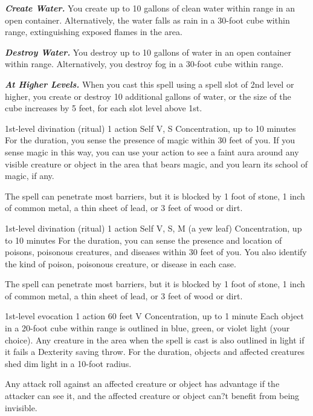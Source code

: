\documentclass[10pt,twoside,twocolumn,openany]{book}
\newcommand\impact[1]{
	\textbf{\textit{#1}}
}
\begin{document}
\impact{Create Water.} You create up to 10 gallons of clean
water within range in an open container. Alternatively, the water falls as rain in a 30-foot cube within range, extinguishing exposed flames in the area.

\impact{Destroy Water.} You destroy up to 10 gallons of water in an open container within range. Alternatively, you destroy fog in a 30-foot cube within range.

\impact{At Higher Levels.} When you cast this spell using a spell slot of 2nd level or higher, you create or destroy 10 additional gallons of water, or the size of the cube increases by 5 feet, for each slot level above 1st.

{1st-level divination {\color{ritual}(ritual)}}
{\color{action} 1 action}
{Self}
{V, S}
{{\color{concentration}Concentration}, up to 10 minutes}
%
For the duration, you sense the presence of magic
within 30 feet of you. If you sense magic in this way, you can use your action to see a faint aura around any visible creature or object in the area that bears magic, and you learn its school of magic, if any.

The spell can penetrate most barriers, but it is blocked by 1 foot of stone, 1 inch of common metal, a thin sheet of lead, or 3 feet of wood or dirt.

\newpage
{}
{1st-level divination {\color{ritual}(ritual)}}
{\color{action} 1 action}
{Self}
{V, S, M (a yew leaf)}
{{\color{concentration}Concentration}, up to 10 minutes}
%
For the duration, you can sense the presence and location of poisons, poisonous creatures, and diseases within 30 feet of you. You also identify the kind of poison, poisonous creature, or disease in each case.

The spell can penetrate most barriers, but it is blocked by 1 foot of stone, 1 inch of common metal, a thin sheet of lead, or 3 feet of wood or dirt.

{1st-level evocation}
{\color{action} 1 action}
{60 feet}
{V}
{{\color{concentration}Concentration}, up to 1 minute}
Each object in a 20-foot cube within range is outlined in blue, green, or violet light (your choice). Any creature in the area when the spell is cast is also outlined in light if it fails a Dexterity saving throw. For the duration, objects and affected creatures shed dim light in a 10-foot radius.

Any attack roll against an affected creature or object has advantage if the attacker can see it, and the affected creature or object can?t benefit from being invisible.
\end{document}
